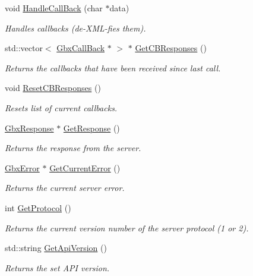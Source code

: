 \begin{DoxyCompactItemize}
void \hyperlink{classGbxRemote_aa46d673f3160aed8d7062c209504a0db}{Handle\-Call\-Back} (char $\ast$data)
\begin{DoxyCompactList}\small\item\em Handles callbacks (de-\/\-X\-M\-L-\/fies them). \end{DoxyCompactList}\item 
std\-::vector$<$ \hyperlink{classGbxCallBack}{Gbx\-Call\-Back} $\ast$ $>$ $\ast$ \hyperlink{classGbxRemote_aaf03cc4c57ec402c91727ee2941814df}{Get\-C\-B\-Responses} ()
\begin{DoxyCompactList}\small\item\em Returns the callbacks that have been received since last call. \end{DoxyCompactList}\item 
void \hyperlink{classGbxRemote_a81ba62f042948610a3cf720316e22076}{Reset\-C\-B\-Responses} ()
\begin{DoxyCompactList}\small\item\em Resets list of current callbacks. \end{DoxyCompactList}\item 
\hyperlink{classGbxResponse}{Gbx\-Response} $\ast$ \hyperlink{classGbxRemote_adac67444e391ffcc1dfda8f087eaef0b}{Get\-Response} ()
\begin{DoxyCompactList}\small\item\em Returns the response from the server. \end{DoxyCompactList}\item 
\hyperlink{structGbxError}{Gbx\-Error} $\ast$ \hyperlink{classGbxRemote_a5467b5400129cd13239f88576aaaa2b4}{Get\-Current\-Error} ()
\begin{DoxyCompactList}\small\item\em Returns the current server error. \end{DoxyCompactList}\item 
int \hyperlink{classGbxRemote_ae6e15060920a31482fd14045cfd42803}{Get\-Protocol} ()
\begin{DoxyCompactList}\small\item\em Returns the current version number of the server protocol (1 or 2). \end{DoxyCompactList}\item 
std\-::string \hyperlink{classGbxRemote_a6351f71fe649bff2aabfbd9b7c89e3f5}{Get\-Api\-Version} ()
\begin{DoxyCompactList}\small\item\em Returns the set A\-P\-I version. \end{DoxyCompactList}\end{DoxyCompactItemize}
